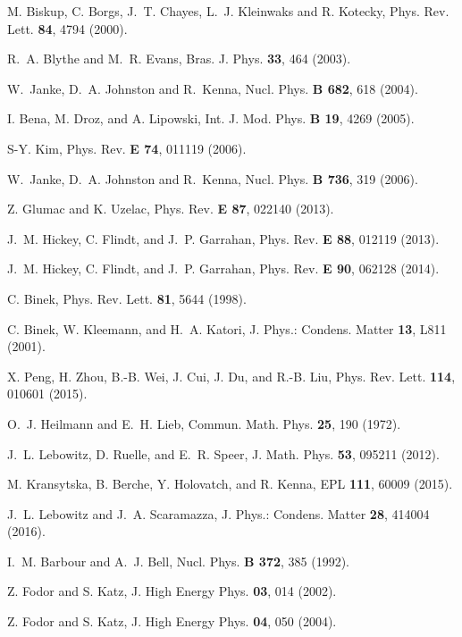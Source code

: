 \documentclass[aps,pre,showpacs,amsmath,amssymb,superscriptaddress,twocolumn]{revtex4-1}
\begin{document}
\begin{thebibliography}{99}
 M. Biskup, C. Borgs, J.~T. Chayes, L.~J. Kleinwaks and R. Kotecky, Phys. Rev. Lett. {\bf 84}, 4794 (2000).

 R.~A. Blythe and M.~R. Evans, Bras. J. Phys. {\bf 33}, 464 (2003).

 W.~Janke, D.~A. Johnston and R.~Kenna, Nucl. Phys. {\bf B 682}, 618 (2004).

 I. Bena, M. Droz, and A. Lipowski, Int. J. Mod. Phys. {\bf B 19}, 4269 (2005). 

 S-Y. Kim, Phys. Rev. {\bf E 74}, 011119 (2006).

 W.~Janke, D.~A. Johnston and R.~Kenna, Nucl. Phys. {\bf B 736}, 319 (2006).

 Z. Glumac and K. Uzelac, Phys. Rev. {\bf E 87}, 022140 (2013).

 J.~M. Hickey, C. Flindt, and J.~P. Garrahan, Phys. Rev. {\bf E 88}, 012119 (2013).

 J.~M. Hickey, C. Flindt, and J.~P. Garrahan, Phys. Rev. {\bf E 90}, 062128 (2014).

 C. Binek, Phys. Rev. Lett. {\bf 81}, 5644 (1998).

 C. Binek, W. Kleemann, and H.~A. Katori,  J. Phys.: Condens. Matter {\bf 13}, L811 (2001).

 X. Peng, H. Zhou, B.-B. Wei, J. Cui, J. Du, and R.-B. Liu, Phys. Rev. Lett. {\bf 114}, 010601 (2015).

 O.~J. Heilmann and E.~H. Lieb, Commun. Math. Phys. {\bf 25}, 190 (1972).

 J.~L. Lebowitz, D. Ruelle, and E.~R. Speer, J. Math. Phys. {\bf 53}, 095211 (2012).

 M. Kransytska, B. Berche, Y. Holovatch, and R. Kenna, EPL {\bf 111}, 60009 (2015).

 J.~L. Lebowitz and J.~A. Scaramazza, J. Phys.: Condens. Matter {\bf 28}, 414004 (2016).

 I.~M. Barbour and A.~J. Bell, Nucl. Phys. {\bf B 372}, 385 (1992).

 Z. Fodor and S. Katz, J. High Energy Phys. {\bf 03}, 014 (2002).

 Z. Fodor and S. Katz, J. High Energy Phys. {\bf 04}, 050 (2004).


\end{thebibliography}
\end{document}
